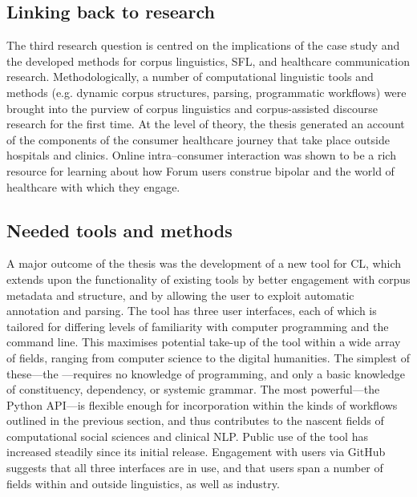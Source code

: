 \subsection{Linking back to research}

The third research question is centred on the implications of the case study and the developed methods for corpus linguistics, \gls{SFL}, and healthcare communication research. Methodologically, a number of computational linguistic tools and methods (e.g. dynamic corpus structures, parsing, programmatic workflows) were brought into the purview of corpus linguistics and corpus-assisted discourse research for the first time. At the level of theory, the thesis generated an account of the components of the consumer healthcare journey that take place outside hospitals and clinics. Online intra--consumer interaction was shown to be a rich resource for learning about how Forum users construe \gls{bipolar} and the world of healthcare with which they engage. 

\subsection{Needed tools and methods}

A major outcome of the thesis was the development of a new tool for \gls{CL}, which extends upon the functionality of existing tools by better engagement with corpus metadata and structure, and by allowing the user to exploit automatic annotation and parsing. The tool has three user interfaces, each of which is tailored for differing levels of familiarity with computer programming and the command line. This maximises potential take\hyp{}up of the tool within a wide array of fields, ranging from computer science to the digital humanities. The simplest of these---the ---requires no knowledge of programming, and only a basic knowledge of constituency, dependency, or systemic grammar. The most powerful---the Python \gls{API}---is flexible enough for incorporation within the kinds of workflows outlined in the previous section, and thus contributes to the nascent fields of computational social sciences and clinical \gls{NLP}. Public use of the tool has increased steadily since its initial release. Engagement with users via GitHub suggests that all three interfaces are in use, and that users span a number of fields within and outside linguistics, as well as industry.


